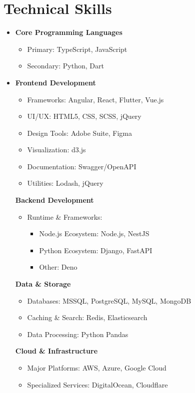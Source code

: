 \section{Technical Skills}
\begin{itemize}[leftmargin=*, itemsep=0.1em, label={}]
	\item \textbf{Core Programming Languages}
	\begin{itemize}
		\item Primary: TypeScript, JavaScript
		\item Secondary: Python, Dart
	\end{itemize}
	
	\item \textbf{Frontend Development}
	\begin{itemize}
		\item Frameworks: Angular, React, Flutter, Vue.js
		\item UI/UX: HTML5, CSS, SCSS, jQuery
		\item Design Tools: Adobe Suite, Figma
		\item Visualization: d3.js
		\item Documentation: Swagger/OpenAPI
		\item Utilities: Lodash, jQuery
	\end{itemize}
	
	\textbf{Backend Development}
	\begin{itemize}
		\item Runtime \& Frameworks:
		\begin{itemize}[label=-, leftmargin=*, itemsep=0.1em]
			\item Node.js Ecosystem: Node.js, NestJS
			\item Python Ecosystem: Django, FastAPI
			\item Other: Deno
		\end{itemize}
	\end{itemize}
	
	\textbf{Data \& Storage}
	\begin{itemize}
		\item Databases: MSSQL, PostgreSQL, MySQL, MongoDB
		\item Caching \& Search: Redis, Elasticsearch
		\item Data Processing: Python Pandas
	\end{itemize}
	
	\textbf{Cloud \& Infrastructure}
	\begin{itemize}
		\item Major Platforms: AWS, Azure, Google Cloud
		\item Specialized Services: DigitalOcean, Cloudflare
	\end{itemize}
	

\end{itemize}
